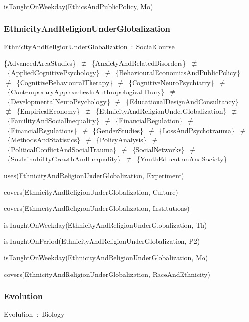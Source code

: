 \documentclass{article}
\begin{document}
isTaughtOnWeekday(EthicsAndPublicPolicy, Mo)

\subsubsection*{EthnicityAndReligionUnderGlobalization}

EthnicityAndReligionUnderGlobalization~:~SocialCourse

\{AdvancedAreaStudies\}~\ensuremath{\not\equiv}~\{AnxietyAndRelatedDisorders\}~\ensuremath{\not\equiv}~\{AppliedCognitivePsychology\}~\ensuremath{\not\equiv}~\{BehaviouralEconomicsAndPublicPolicy\}~\ensuremath{\not\equiv}~\{CognitiveBehaviouralTherapy\}~\ensuremath{\not\equiv}~\{CognitiveNeuroPsychiatry\}~\ensuremath{\not\equiv}~\{ContemporaryApproachesInAnthropologicalThory\}~\ensuremath{\not\equiv}~\{DevelopmentalNeuroPsychology\}~\ensuremath{\not\equiv}~\{EducationalDesignAndConsultancy\}~\ensuremath{\not\equiv}~\{EmpiricalEconomy\}~\ensuremath{\not\equiv}~\{EthnicityAndReligionUnderGlobalization\}~\ensuremath{\not\equiv}~\{FamilityAndSocialInequality\}~\ensuremath{\not\equiv}~\{FinancialRegulation\}~\ensuremath{\not\equiv}~\{FinancialRegulations\}~\ensuremath{\not\equiv}~\{GenderStudies\}~\ensuremath{\not\equiv}~\{LossAndPsychotrauma\}~\ensuremath{\not\equiv}~\{MethodsAndStatistics\}~\ensuremath{\not\equiv}~\{PolicyAnalysis\}~\ensuremath{\not\equiv}~\{PoliticalConflictAndSocialTrauma\}~\ensuremath{\not\equiv}~\{SocialNetworks\}~\ensuremath{\not\equiv}~\{SustainabilityGrowthAndInequality\}~\ensuremath{\not\equiv}~\{YouthEducationAndSociety\}

uses(EthnicityAndReligionUnderGlobalization, Experiment)

covers(EthnicityAndReligionUnderGlobalization, Culture)

covers(EthnicityAndReligionUnderGlobalization, Institutions)

isTaughtOnWeekday(EthnicityAndReligionUnderGlobalization, Th)

isTaughtOnPeriod(EthnicityAndReligionUnderGlobalization, P2)

isTaughtOnWeekday(EthnicityAndReligionUnderGlobalization, Mo)

covers(EthnicityAndReligionUnderGlobalization, RaceAndEthnicity)

\subsubsection*{Evolution}

Evolution~:~Biology
\end{document}
